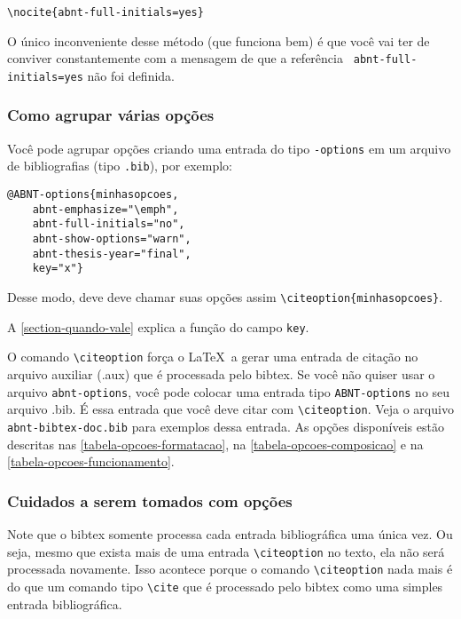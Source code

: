 \documentclass[a4paper]{ltxdoc}
\begin{document}
\begin{verbatim}
\nocite{abnt-full-initials=yes}
\end{verbatim}

O único inconveniente desse método (que funciona bem) é que você vai ter de
conviver constantemente com a mensagem de que a referência \texttt{
abnt-full-initials=yes} não foi definida.

\subsubsection{Como agrupar várias opções}

\DescribeMacro{\citeoption}
Você pode agrupar opções criando uma entrada do tipo \texttt{\@ABNT-options}
em um arquivo de bibliografias (tipo \texttt{.bib}), por exemplo:

\begin{verbatim}
@ABNT-options{minhasopcoes,
	abnt-emphasize="\emph",
	abnt-full-initials="no",
	abnt-show-options="warn",
	abnt-thesis-year="final",
	key="x"}
\end{verbatim}

Desse modo, deve deve chamar suas opções assim \verb+\citeoption{minhasopcoes}+.

A \autoref{section-quando-vale} explica a função do campo \texttt{key}.


O comando \verb+\citeoption+ força o \LaTeX\ a gerar uma entrada de citação no
arquivo auxiliar (.aux) que é processada pelo \textsf{bibtex}. Se você não
quiser usar o arquivo \texttt{abnt-options}, você pode colocar uma entrada tipo
\texttt{ABNT-options} no seu arquivo .bib. É essa entrada que você deve citar com
\verb+\citeoption+. Veja o arquivo \texttt{abnt-bibtex-doc.bib} para exemplos dessa
entrada. As opções disponíveis estão descritas nas
\autoref{tabela-opcoes-formatacao}, na \autoref{tabela-opcoes-composicao} e na
\autoref{tabela-opcoes-funcionamento}.

\subsubsection{Cuidados a serem tomados com opções}

Note que o \textsf{bibtex} somente processa cada entrada bibliográfica uma única
vez. Ou seja, mesmo que exista mais de uma entrada \verb+\citeoption+ no texto,
ela não será processada novamente. Isso acontece porque o comando
\verb+\citeoption+ nada mais é do que um comando tipo \verb+\cite+ que é
processado pelo \textsf{bibtex} como uma simples entrada bibliográfica.
\end{document}
